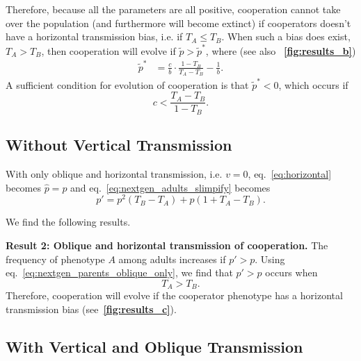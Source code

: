 \documentclass[12pt]{extarticle}
\begin{document}
Therefore, because all the parameters are all positive, cooperation cannot take over the population (and furthermore will become extinct) if cooperators doesn't have a horizontal transmission bias, i.e. if $T_A\leq T_B$.
When such a bias does exist, $T_A > T_B$, then cooperation will evolve if $\tilde{p} > \tilde{p}^{*}$, where (see also ~\textbf{\autoref{fig:results_b}})
\begin{equation} 
\begin{split} \label{eq:horizontal_transmission_from_population_equilibrium}
\tilde{p}^{*} & = \frac{c}{b} \cdot \frac{1-T_B}{T_A-T_B} - \frac{1}{b}.
\end{split}
\end{equation}
A sufficient condition for evolution of cooperation is that $\tilde{p}^{*} < 0$, which occurs if
\begin{equation} \label{eq:sufficient_horizontal_transmission_from_population}
c < \frac{T_A-T_B}{1-T_B} .  
\end{equation}


\subsection*{Without Vertical Transmission}

With only oblique and horizontal transmission, i.e. $v = 0$, eq.~\ref{eq:horizontal} becomes $\hat{p}=p$ and eq.~\ref{eq:nextgen_adults_slimpify} becomes %
\begin{equation}  \label{eq:nextgen_parents_oblique_only}
p' = p^2 (T_B-T_A) + p (1+T_A-T_B) .
\end{equation}

We find the following results.

\textbf{Result 2: Oblique and horizontal transmission of cooperation.} The frequency of phenotype $A$ among adults increases if $p'>p$.
Using eq.~\ref{eq:nextgen_parents_oblique_only}, we find that $p'>p$ occurs when
\begin{equation} \label{eq:oblique_only_result}
T_A > T_B . 
\end{equation}
Therefore, cooperation will evolve if the cooperator phenotype has a horizontal transmission bias (see~\textbf{\autoref{fig:results_c}}).

\subsection*{With Vertical and Oblique Transmission}
\end{document}
